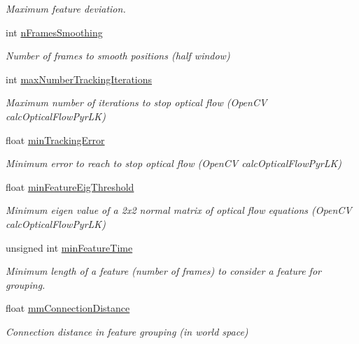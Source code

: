 \begin{DoxyCompactItemize}
\begin{DoxyCompactList}\small\item\em Maximum feature deviation. \end{DoxyCompactList}\item 
int \hyperlink{structKLTFeatureTrackingParameters_ad5a4d722c17641c805483790fda819c9}{n\-Frames\-Smoothing}
\begin{DoxyCompactList}\small\item\em Number of frames to smooth positions (half window) \end{DoxyCompactList}\item 
int \hyperlink{structKLTFeatureTrackingParameters_a491f9f95b04854f413e2a262d32c0ae3}{max\-Number\-Tracking\-Iterations}
\begin{DoxyCompactList}\small\item\em Maximum number of iterations to stop optical flow (Open\-C\-V calc\-Optical\-Flow\-Pyr\-L\-K) \end{DoxyCompactList}\item 
float \hyperlink{structKLTFeatureTrackingParameters_a52dd1c8d9b949260f7715f5fa705217e}{min\-Tracking\-Error}
\begin{DoxyCompactList}\small\item\em Minimum error to reach to stop optical flow (Open\-C\-V calc\-Optical\-Flow\-Pyr\-L\-K) \end{DoxyCompactList}\item 
float \hyperlink{structKLTFeatureTrackingParameters_a9276bdc0bbba6a06cab152993a774be8}{min\-Feature\-Eig\-Threshold}
\begin{DoxyCompactList}\small\item\em Minimum eigen value of a 2x2 normal matrix of optical flow equations (Open\-C\-V calc\-Optical\-Flow\-Pyr\-L\-K) \end{DoxyCompactList}\item 
unsigned int \hyperlink{structKLTFeatureTrackingParameters_ae695d0f6bf3e578e744ae94f85b53009}{min\-Feature\-Time}
\begin{DoxyCompactList}\small\item\em Minimum length of a feature (number of frames) to consider a feature for grouping. \end{DoxyCompactList}\item 
float \hyperlink{structKLTFeatureTrackingParameters_a83a3fbc2ab0c369b8ccda3d1669ed988}{mm\-Connection\-Distance}
\begin{DoxyCompactList}\small\item\em Connection distance in feature grouping (in world space) \end{DoxyCompactList}\item 

\end{DoxyCompactItemize}

